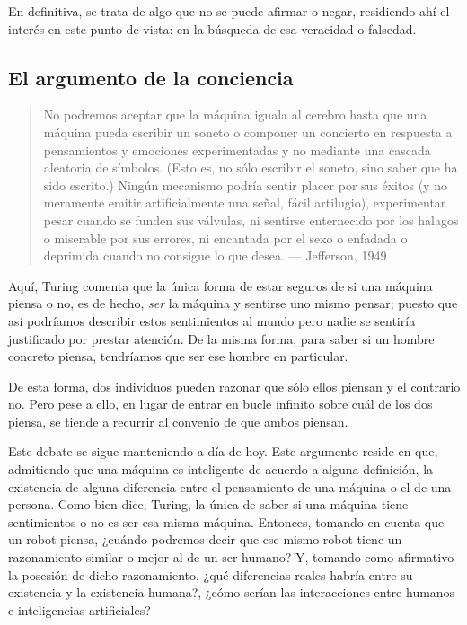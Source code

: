 \documentclass[12pt,a4paper]{article}
\begin{document}
En definitiva, se trata de algo que no se puede afirmar o negar, residiendo ahí el interés en este punto de vista: en la búsqueda de esa veracidad o falsedad.


\subsection{El argumento de la conciencia}
\begin{quote}\small No podremos aceptar que la máquina iguala al cerebro hasta que una máquina pueda escribir un soneto o componer un concierto en respuesta a pensamientos y emociones experimentadas y no mediante una cascada aleatoria de símbolos. (Esto es, no sólo escribir el soneto, sino saber que ha sido escrito.) Ningún mecanismo podría sentir placer por sus éxitos (y no meramente emitir artificialmente una señal, fácil artilugio), experimentar pesar cuando se funden sus válvulas, ni sentirse enternecido por los halagos o miserable por sus errores, ni encantada por el sexo o enfadada o deprimida cuando no consigue lo que desea. — Jefferson, 1949\end{quote}

Aquí, Turing comenta que la única forma de estar seguros de si una máquina piensa o no, es de hecho, \emph{ser} la máquina y sentirse uno mismo pensar; puesto que así podríamos describir estos sentimientos al mundo pero nadie se sentiría justificado por prestar atención. De la misma forma, para saber si un hombre concreto piensa, tendríamos que ser ese hombre en particular.

De esta forma, dos individuos pueden razonar que sólo ellos piensan y el contrario no. Pero pese a ello, en lugar de entrar en bucle infinito sobre cuál de los dos piensa, se tiende a recurrir al convenio de que ambos piensan.

Este debate se sigue manteniendo a día de hoy. Este argumento reside en que, admitiendo que una máquina es inteligente de acuerdo a alguna definición, la existencia de alguna diferencia entre el pensamiento de una máquina o el de una persona. Como bien dice, Turing, la única de saber si una máquina tiene sentimientos o no es ser esa misma máquina. Entonces, tomando en cuenta que un robot piensa, ¿cuándo podremos decir que ese mismo robot tiene un razonamiento similar o mejor al de un ser humano? Y, tomando como afirmativo la posesión de dicho razonamiento, ¿qué diferencias reales habría entre su existencia y la existencia humana?, ¿cómo serían las interacciones entre humanos e inteligencias artificiales?
\end{document}
